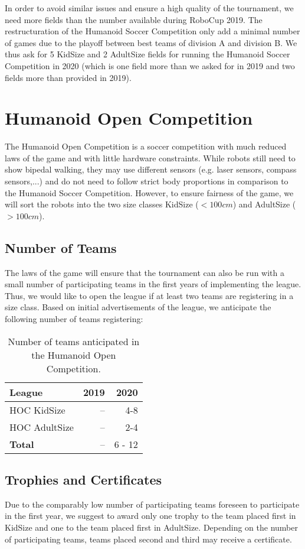 \documentclass{article}
\begin{document}
In order to avoid similar issues and ensure a high quality of the tournament,
we need more fields than the number available during RoboCup 2019.
The restructuration of the Humanoid Soccer Competition only add a minimal number
of games due to the playoff between best teams of division A and division B.
We thus ask for 5 KidSize and 2 AdultSize fields for running the Humanoid Soccer
Competition in 2020 (which is one field more than we asked for in 2019 and two
fields more than provided in 2019).

\section{Humanoid Open Competition}

The Humanoid Open Competition is a soccer competition with much reduced laws of the game and with little hardware constraints. While robots still need to show bipedal walking, they may use different sensors (e.g. laser sensors, compass sensors,...) and do not need to follow strict body proportions in comparison to the Humanoid Soccer Competition. However, to ensure fairness of the game, we will sort the robots into the two size classes KidSize ($< 100 cm$) and AdultSize ($> 100 cm$). 

\subsection{Number of Teams}
The laws of the game will ensure that the tournament can also be run with a small number of participating teams in the first years of implementing the league. Thus, we would like to open the league if at least two teams are registering in a size class. Based on initial advertisements of the league, we anticipate the following number of teams registering:

\begin{table}[h]
  \centering
  \begin{tabular}{l | r | r}
    League & 2019 & 2020\\
    \hline
    HOC KidSize & -- & 4-8\\
    HOC AdultSize & -- & 2-4\\ 
    \hline
    \textbf{Total} & -- & 6 - 12
  \end{tabular}
  \caption{Number of teams anticipated in the Humanoid Open Competition.}

\end{table}

\subsection{Trophies and Certificates}
Due to the comparably low number of participating teams foreseen to participate in the first year, we suggest to award only one trophy to the team placed first in KidSize and one to the team placed first in AdultSize. Depending on the number of participating teams, teams placed second and third may receive a certificate.
\end{document}

